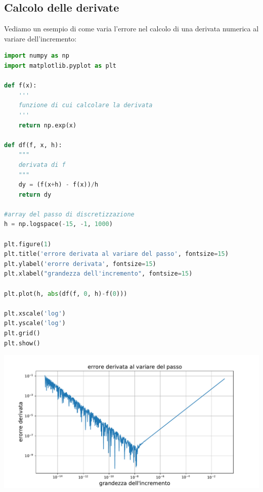 \documentclass[10pt,a4paper]{article}
\begin{document}
\subsection{Calcolo delle derivate}
Vediamo un esempio di come varia l'errore nel calcolo di una derivata numerica al variare dell'incremento:

\begin{lstlisting}[language=Python]
import numpy as np
import matplotlib.pyplot as plt

def f(x):
    '''
    funzione di cui calcolare la derivata
    '''
    return np.exp(x)

def df(f, x, h):
    """
    derivata di f
    """
    dy = (f(x+h) - f(x))/h
    return dy

#array del passo di discretizzazione
h = np.logspace(-15, -1, 1000)

plt.figure(1)
plt.title('errore derivata al variare del passo', fontsize=15)
plt.ylabel('erorre derivata', fontsize=15)
plt.xlabel("grandezza dell'incremento", fontsize=15)

plt.plot(h, abs(df(f, 0, h)-f(0)))

plt.xscale('log')
plt.yscale('log')
plt.grid()
plt.show()

\end{lstlisting}

\begin{center}
\includegraphics[scale=0.7]{img/err_deriv.pdf}

\end{center}
\end{document}
